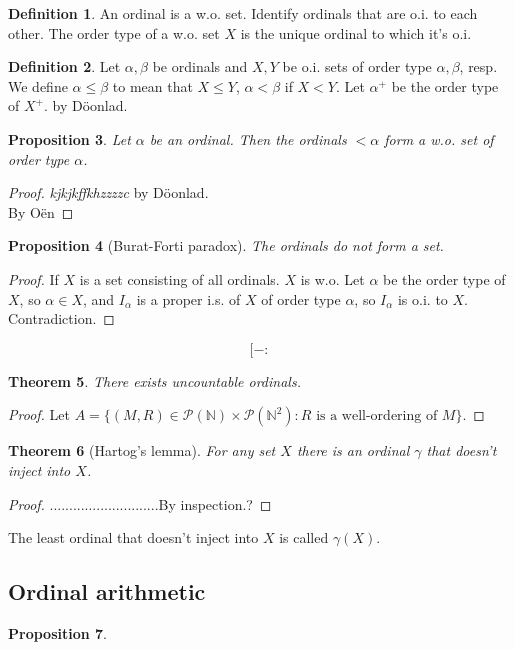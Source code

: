 \documentclass{article}
\theoremstyle{definition}
\newtheorem{defn}{Definition}[section]
\theoremstyle{remark}
\theoremstyle{plain}
\newtheorem{thm}[defn]{Theorem}
\newtheorem{prop}[defn]{Proposition}
\newcommand{\NN}{\mathbb{N}}
\begin{document}
\begin{defn}
    An ordinal is a w.o. set. Identify ordinals that are o.i. to each other. The order type of a w.o. set $X$ is the unique ordinal to which it's o.i.
\end{defn}
\begin{defn}
    Let $\alpha,\beta$ be ordinals and $X, Y$ be o.i. sets of order type $\alpha,\beta$, resp. We define $\alpha\le\beta$ to mean that $X\le Y$, $\alpha<\beta$ if $X<Y$. Let $\alpha^+$ be the order type of $X^+$.  by D\"oonlad.
\end{defn}

\begin{prop}
    Let $\alpha$ be an ordinal. Then the ordinals \(<\alpha\) form a w.o. set of order type $\alpha$.
\end{prop}
\begin{proof}
    \textit{kjkjkffkhzzzzc} by D\"oonlad.\\
     By O\"en
\end{proof}
\begin{prop}[Burat-Forti paradox]
    The ordinals do not form a set.
\end{prop}
\begin{proof}
    If $X$ is a set consisting of all ordinals. $X$ is w.o. Let $\alpha$ be the order type of $X$, so $\alpha\in X$, and $I_\alpha$ is a proper i.s. of $X$ of order type $\alpha$, so $I_\alpha$ is o.i. to $X$. Contradiction.
\end{proof}
\[[-:\tag{Owen's Signature}\]
\begin{thm}
    There exists uncountable ordinals.
\end{thm}
\begin{proof}
    Let $A=\{(M,R)\in \mathscr P(\NN)\times\mathscr P(\NN^2):R\text{ is a well-ordering of }M\}$.
\end{proof}
\begin{thm}[Hartog's lemma]
    For any set $X$ there is an ordinal $\gamma$ that doesn't inject into $X$.
\end{thm}
\begin{proof}
    ............................By inspection.?
\end{proof}
The least ordinal that doesn't inject into $X$ is called $\gamma(X)$.
\subsection*{Ordinal arithmetic}
\begin{prop}
    
\end{prop}
\end{document}
